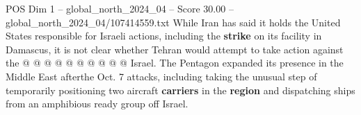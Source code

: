 \begin{textsample}{POS Dim 1 – global\_north\_2024\_04 – Score 30.00 – global\_north\_2024\_04/107414559.txt}
While Iran has said it holds the United States responsible for Israeli actions, including the \textbf{strike} on its facility in Damascus, it is not clear whether Tehran would attempt to take action against the @ @ @ @ @ @ @ @ @ @ Israel.
The Pentagon expanded its presence in the Middle East afterthe Oct. 7 attacks, including taking the unusual step of temporarily positioning two aircraft \textbf{carriers} in the \textbf{region} and dispatching ships from an amphibious ready group off Israel.

\end{textsample}
